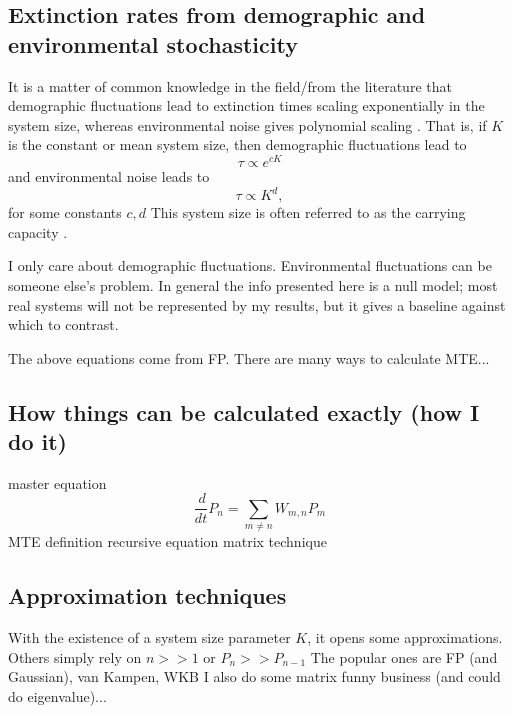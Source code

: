 \documentclass[a4paper,11pt]{article}
\numberwithin{equation}{section} %
\begin{document}
\subsection{Extinction rates from demographic and environmental stochasticity}
It is a matter of common knowledge in the field/from the literature that demographic fluctuations lead to extinction times scaling exponentially in the system size, whereas environmental noise gives polynomial scaling \cite{?}. 
That is, if $K$ is the constant or mean system size, then demographic fluctuations lead to
\begin{equation}
\tau \propto e^{cK}
\end{equation}
and environmental noise leads to
\begin{equation}
\tau \propto K^d,
\end{equation}
for some constants $c,d$
This system size is often referred to as the carrying capacity \cite{?}. 

I only care about demographic fluctuations. Environmental fluctuations can be someone else's problem. 
In general the info presented here is a null model; most real systems will not be represented by my results, but it gives a baseline against which to contrast. 

The above equations come from FP. There are many ways to calculate MTE...

\subsection{How things can be calculated exactly (how I do it)}
master equation
\begin{equation}
\frac{\,d}{dt}P_n = \sum_{m\neq n} W_{m,n}P_m
\end{equation}
MTE definition
recursive equation
matrix technique

\subsection{Approximation techniques}

With the existence of a system size parameter $K$, it opens some approximations. 
Others simply rely on $n>>1$ or $P_n>>P_{n-1}$
The popular ones are FP (and Gaussian), van Kampen, WKB
I also do some matrix funny business (and could do eigenvalue)...
\end{document}
